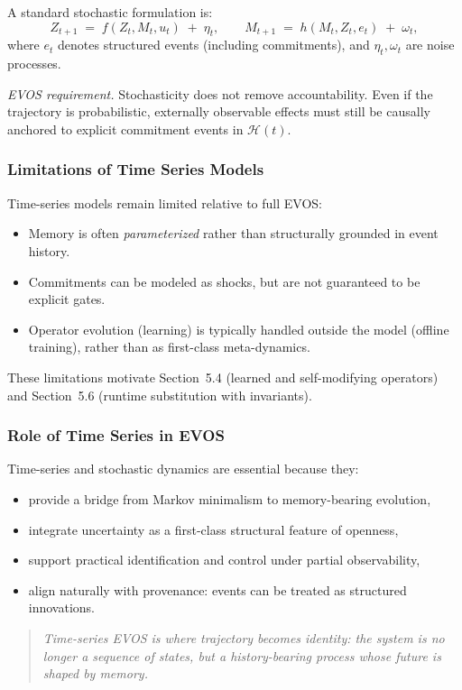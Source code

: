\documentclass[11pt]{article}
\begin{document}
A standard stochastic formulation is:
\[
Z_{t+1} \;=\; f(Z_t, M_t, u_t) \;+\; \eta_t,
\qquad
M_{t+1} \;=\; h(M_t, Z_t, e_t) \;+\; \omega_t,
\]
where $e_t$ denotes structured events (including commitments), and $\eta_t,\omega_t$ are
noise processes.

\emph{EVOS requirement.} Stochasticity does not remove accountability. Even if the
trajectory is probabilistic, externally observable effects must still be causally
anchored to explicit commitment events in $\mathcal{H}(t)$.

\subsubsection{Limitations of Time Series Models}

Time-series models remain limited relative to full EVOS:
\begin{itemize}
  \item Memory is often \emph{parameterized} rather than structurally grounded in event history.
  \item Commitments can be modeled as shocks, but are not guaranteed to be explicit gates.
  \item Operator evolution (learning) is typically handled outside the model (offline training),
        rather than as first-class meta-dynamics.
\end{itemize}

These limitations motivate Section~5.4 (learned and self-modifying operators) and
Section~5.6 (runtime substitution with invariants).

\subsubsection{Role of Time Series in EVOS}

Time-series and stochastic dynamics are essential because they:
\begin{itemize}
  \item provide a bridge from Markov minimalism to memory-bearing evolution,
  \item integrate uncertainty as a first-class structural feature of openness,
  \item support practical identification and control under partial observability,
  \item align naturally with provenance: events can be treated as structured innovations.
\end{itemize}

\begin{quote}
\emph{Time-series EVOS is where trajectory becomes identity: the system is no longer a
sequence of states, but a history-bearing process whose future is shaped by memory.}
\end{quote}
\end{document}
